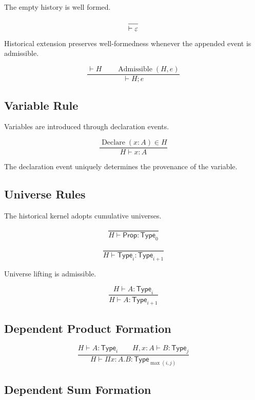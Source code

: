 \documentclass[12pt,oneside]{article}
\theoremstyle{definition}
\theoremstyle{remark}
\newcommand{\Type}{\mathsf{Type}}
\newcommand{\Prop}{\mathsf{Prop}}
\begin{document}
The empty history is well formed.

\[
\frac{}{%
\vdash
\varepsilon
}
\]

Historical extension preserves well-formedness whenever the appended event is
admissible.

\[
\frac{
\vdash H
\qquad
\operatorname{Admissible}(H,e)
}{
\vdash
H;e
}
\]


\subsection{Variable Rule}

Variables are introduced through declaration events.

\[
\frac{
\operatorname{Declare}(x:A)
\in
H
}{
H
\vdash
x
:
A
}
\]

The declaration event uniquely determines the provenance of the variable.


\subsection{Universe Rules}

The historical kernel adopts cumulative universes.

\[
\frac{}{
H
\vdash
\Prop
:
\Type_0
}
\]

\[
\frac{}{
H
\vdash
\Type_i
:
\Type_{i+1}
}
\]

Universe lifting is admissible.

\[
\frac{
H
\vdash
A
:
\Type_i
}{
H
\vdash
A
:
\Type_{i+1}
}
\]


\subsection{Dependent Product Formation}

\[
\frac{
H
\vdash
A
:
\Type_i
\qquad
H,
x:A
\vdash
B
:
\Type_j
}{
H
\vdash
\Pi
x:A.
B
:
\Type_{\max(i,j)}
}
\]


\subsection{Dependent Sum Formation}
\end{document}
